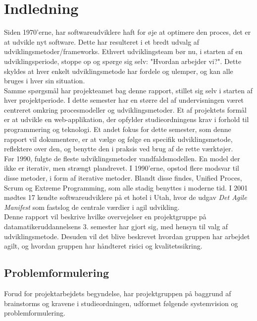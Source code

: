 \chapter{Indledning}\label{ch:indledning}
Siden 1970'erne, har softwareudviklere haft for øje at optimere den proces, det er at udvikle nyt software.
Dette har resulteret i et bredt udvalg af udviklingsmetoder/frameworks. Ethvert udviklingsteam bør nu, 
i starten af en udviklingsperiode, stoppe op og spørge sig selv: "Hvordan arbejder vi?". 
Dette skyldes at hver enkelt udviklingsmetode har fordele og ulemper, og kan alle bruges i hver sin situation. \\

Samme spørgsmål har projekteamet bag denne rapport, stillet sig selv i starten af hver projektperiode. 
I dette semester har en større del af undervisningen
været centreret omkring procesmodeller og udviklingsmetoder. 
Et af projektets formål er at udvikle en web-applikation, der opfylder studieordningens krav
i forhold til programmering og teknologi. Et andet fokus for dette semester, 
som denne rapport vil dokumentere, er at vælge og følge en specifik udviklingsmetode, 
reflektere over den, og benytte den i praksis ved brug af de rette værktøjer. \\

Før 1990, fulgte de fleste udviklingsmetoder vandfaldsmodellen. En model der ikke er iterativ, 
men strængt plandrevet. I 1990'erne, opstod flere modsvar til
disse metoder, i form af iterative metoder. Blandt disse findes, Unified Proces, Scrum og Extreme Programming, 
som alle stadig benyttes i moderne tid.
I 2001 mødtes 17 kendte softwareudviklere på et hotel i Utah, 
hvor de udgav \textit{Det Agile Manifest} som fastslog de centrale værdier i agil udvikling. \\

Denne rapport vil beskrive hvilke overvejelser en projektgruppe på 
datamatikeruddannelsens 3. semester har gjort sig, med hensyn til valg af udviklingsmetode.
Desuden vil det blive beskrevet hvordan gruppen har arbejdet agilt, 
og hvordan gruppen har håndteret risici og kvalitetssikring.

\newpage
\section{Problemformulering}
Forud for projektarbejdets begyndelse, har projektgruppen på baggrund af brainstorms og kravene i
studieordningen, udformet følgende systemvision og problemformulering. \\

